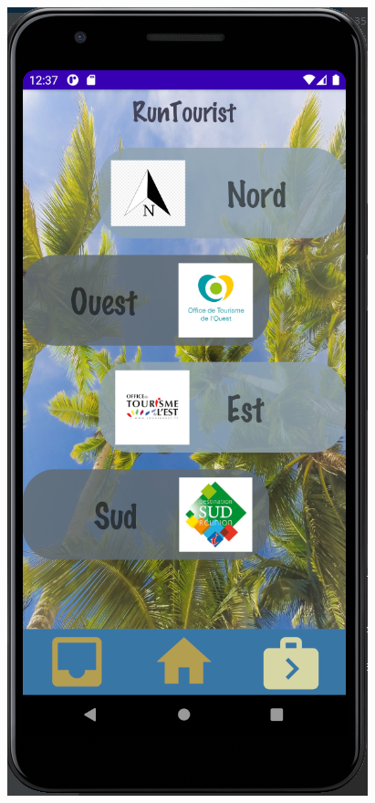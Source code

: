 \documentclass{article}
\begin{document}
\begin{minipage}{0.3\textwidth}
\includegraphics[width=\textwidth]{Lieux_a_visiter}
\end{minipage}
\end{document}
